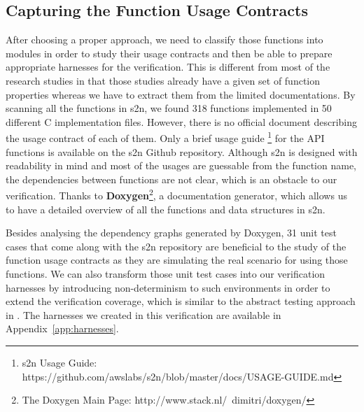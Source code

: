 \subsection{Capturing the Function Usage Contracts}
\label{sec:cfuc}
After choosing a proper approach, we need to classify those functions into modules in order to study their usage contracts and then be able to prepare appropriate harnesses for the verification. This is different from most of the research studies in that those studies already have a given set of function properties whereas we have to extract them from the limited documentations. By scanning all the functions in s2n, we found 318 functions implemented in 50 different C implementation files. However, there is no official document describing the usage contract of each of them. Only a brief usage guide \footnote{s2n Usage Guide: https://github.com/awslabs/s2n/blob/master/docs/USAGE-GUIDE.md} for the API functions is available on the s2n Github repository. Although s2n is designed with readability in mind and most of the usages are guessable from the function name, the dependencies between functions are not clear, which is an obstacle to our verification. Thanks to \textbf{Doxygen}\footnote{The Doxygen Main Page: http://www.stack.nl/~dimitri/doxygen/}, a documentation generator, which allows us to have a detailed overview of all the functions and data structures in s2n. 

Besides analysing the dependency graphs generated by Doxygen, 31 unit test cases that come along with the s2n repository are beneficial to the study of the function usage contracts as they are simulating the real scenario for using those functions. We can also transform those unit test cases into our verification harnesses by introducing non-determinism to such environments in order to extend the verification coverage, which is similar to the abstract testing approach in \cite{Merz:2015:BGT:2837773.2837824}. The harnesses we created in this verification are available in Appendix~\ref{app:harnesses}.

